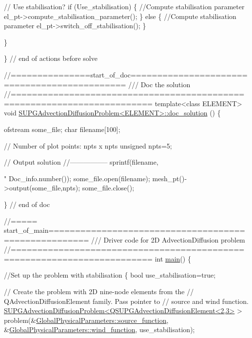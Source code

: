 \begin{DoxyCodeInclude}
   \textcolor{comment}{// Use stabilisation?}
   \textcolor{keywordflow}{if} (Use\_stabilisation)
    \{
     \textcolor{comment}{//Compute stabilisation parameter}
     el\_pt->compute\_stabilisation\_parameter();
    \}
   \textcolor{keywordflow}{else}
    \{
     \textcolor{comment}{//Compute stabilisation parameter}
     el\_pt->switch\_off\_stabilisation();
    \}

  \}

\}  \textcolor{comment}{// end of actions before solve}



\textcolor{comment}{//===============start\_of\_doc=============================================}\textcolor{comment}{}
\textcolor{comment}{/// Doc the solution}
\textcolor{comment}{}\textcolor{comment}{//========================================================================}
\textcolor{keyword}{template}<\textcolor{keyword}{class} ELEMENT>
\textcolor{keywordtype}{void} \hyperlink{classSUPGAdvectionDiffusionProblem_a3133ba26f0917f5d210d69ea0ddcb1fe}{SUPGAdvectionDiffusionProblem<ELEMENT>::doc\_solution}
      ()
\{ 

 ofstream some\_file;
 \textcolor{keywordtype}{char} filename[100];

 \textcolor{comment}{// Number of plot points: npts x npts}
 \textcolor{keywordtype}{unsigned} npts=5;

 \textcolor{comment}{// Output solution }
 \textcolor{comment}{//-----------------}
 sprintf(filename,\textcolor{stringliteral}{"%
         Doc\_info.number());
 some\_file.open(filename);
 mesh\_pt()->output(some\_file,npts);
 some\_file.close();

\} \textcolor{comment}{// end of doc}


\textcolor{comment}{//===== start\_of\_main=====================================================}\textcolor{comment}{}
\textcolor{comment}{/// Driver code for 2D AdvectionDiffusion problem}
\textcolor{comment}{}\textcolor{comment}{//========================================================================}
\textcolor{keywordtype}{int} \hyperlink{two__d__adv__diff__SUPG_8cc_ae66f6b31b5ad750f1fe042a706a4e3d4}{main}()
\{

 \textcolor{comment}{//Set up the problem with stabilisation}
 \{
  \textcolor{keywordtype}{bool} use\_stabilisation=\textcolor{keyword}{true};
  
  \textcolor{comment}{// Create the problem with 2D nine-node elements from the}
  \textcolor{comment}{// QAdvectionDiffusionElement family. Pass pointer to }
  \textcolor{comment}{// source and wind function. }
  \hyperlink{classSUPGAdvectionDiffusionProblem}{SUPGAdvectionDiffusionProblem<QSUPGAdvectionDiffusionElement<2,3>}
       > 
   problem(&\hyperlink{namespaceGlobalPhysicalParameters_aa84986d4d50cb043cc8fced56feab45f}{GlobalPhysicalParameters::source\_function},
           &\hyperlink{namespaceGlobalPhysicalParameters_a3a17e62bc0096244627f5f1a7f53c859}{GlobalPhysicalParameters::wind\_function},
           use\_stabilisation);
  
}
\end{DoxyCodeInclude}
